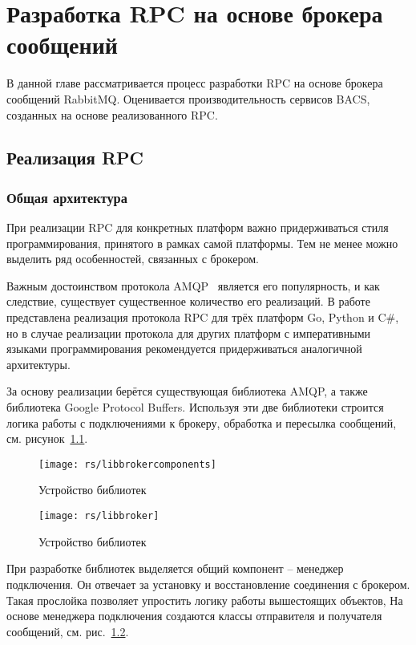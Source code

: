 \chapter{Разработка RPC на основе брокера сообщений}
В данной главе рассматривается процесс разработки RPC на основе
брокера сообщений RabbitMQ. Оценивается производительность сервисов BACS,
созданных на основе реализованного RPC.

\section{Реализация RPC}

\subsection{Общая архитектура}
При реализации RPC для конкретных платформ важно придерживаться стиля
программирования, принятого в рамках самой платформы. Тем не менее
можно выделить ряд особенностей, связанных с брокером.

Важным достоинством протокола AMQP~\cite{amqp} является его популярность,
и как следствие, существует существенное количество его реализаций.
В работе представлена реализация протокола RPC для трёх платформ Go, Python
и C\#, но в случае реализации протокола для других платформ с императивными
языками программирования рекомендуется придерживаться аналогичной архитектуры.

За основу реализации берётся существующая библиотека AMQP, а также библиотека
Google Protocol Buffers. Используя эти две библиотеки строится логика работы
с подключениями к брокеру, обработка и пересылка сообщений,
см. рисунок~\ref{fig:libbrokercomponents}.

\begin{figure}[H]
    \centering
    \texttt{[image: rs/libbrokercomponents]}
    \caption{Устройство библиотек}
    \label{fig:libbrokercomponents}
\end{figure}

\begin{figure}[H]
    \centering
    \texttt{[image: rs/libbroker]}
    \caption{Устройство библиотек}
    \label{fig:libbroker}
\end{figure}

При разработке библиотек выделяется общий компонент -- менеджер подключения.
Он отвечает за установку и восстановление соединения с брокером.
Такая прослойка позволяет упростить логику работы вышестоящих объектов,
На основе менеджера подключения создаются классы отправителя и получателя
сообщений, см. рис.~\ref{fig:libbroker}.

